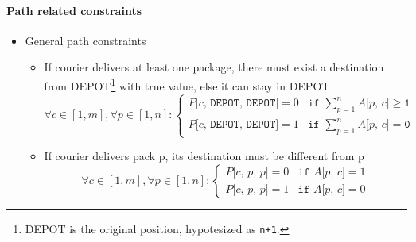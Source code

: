 \paragraph*{Path related constraints}

\begin{itemize}
    \item General path constraints
    \begin{itemize}
        \item If courier delivers at least one package, there must exist a destination from DEPOT\footnote{DEPOT is the original position, hypotesized as \texttt{n+1}.} with true value, else it can stay in DEPOT
        \begin{equation}
            \label{eq:gen_path_constr1}
            \forall c \in [1, m],
            \forall p \in [1, n]:
            \begin{cases}
                P\texttt{[$c$, DEPOT, DEPOT]}=0 & \texttt{if } \sum_{p=1}^{n} A\texttt{[$p$, $c$]} \geq \texttt{1}\\
                P\texttt{[$c$, DEPOT, DEPOT]}=1 & \texttt{if } \sum_{p=1}^{n} A\texttt{[$p$, $c$]} = \texttt{0} %
            \end{cases}
        \end{equation}

        \item If courier delivers pack p, its destination must be different from p 
        \begin{equation}
            \label{eq:gen_path_constr2}
            \forall c \in [1, m],
            \forall p \in [1, n]:
            \begin{cases}
                P\texttt{[$c$, $p$, $p$]}=0 & \texttt{if } A\texttt{[$p$, $c$]}=1\\
                P\texttt{[$c$, $p$, $p$]}=1 & \texttt{if } A\texttt{[$p$, $c$]}=0 %
            \end{cases}
        \end{equation}


\end{itemize}
\end{itemize}
